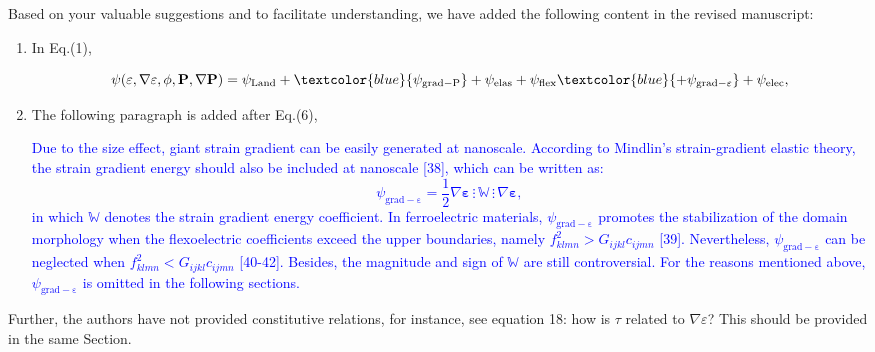 \documentclass[12pt,fleqn]{article}
\begin{document}
\begin{response}
    Based on your valuable suggestions and to facilitate understanding, we have added the following content in the revised manuscript:
    \begin{enumerate}
    \item In Eq.(1),
    \setcounter{equation}{0}
    \begin{revised}
        \begin{equation}
            \psi(\mathbf{\varepsilon},\nabla\mathbf{\varepsilon},\phi,\mathbf{P},\nabla\mathbf{P})
            =\psi_\mathrm{Land}+\textcolor{blue}{\psi_\mathrm{grad-P}}+\psi_\mathrm{elas}+\psi_\mathrm{flex}\textcolor{blue}{+\psi_\mathrm{grad-\varepsilon}}+\psi_\mathrm{elec},
        \end{equation}
    \end{revised}
        \item The following paragraph is added after Eq.(6),
        \setcounter{equation}{7}
        \begin{revised}
        \textcolor{blue}{
            Due to the size effect, giant strain gradient can be easily generated at nanoscale. According to Mindlin's strain-gradient elastic theory, the strain gradient energy should also be included at nanoscale  [38], which can be written as:
\begin{equation}
    \psi_\mathrm{grad-\varepsilon}=\frac{1}{2}\nabla\mathbf{\varepsilon}\,\vdots\,\mathbb{W}\,\vdots\,\nabla\mathbf{\varepsilon},
\end{equation}
in which $\mathbb{W}$ denotes the strain gradient energy coefficient. In ferroelectric materials, $\psi_\mathrm{grad-\varepsilon}$ promotes the stabilization of the domain morphology when the flexoelectric coefficients exceed the upper boundaries, namely $f_{klmn}^2>G_{ijkl}c_{ijmn}$ [39]. Nevertheless,  $\psi_\mathrm{grad-\varepsilon}$ can be neglected when $f_{klmn}^2<G_{ijkl}c_{ijmn}$ [40-42]. Besides, the magnitude and sign of $\mathbb{W}$ are still controversial. For the reasons mentioned above, $\psi_\mathrm{grad-\varepsilon}$ is omitted in the following sections.}
        \end{revised}
    \end{enumerate}
\end{response}
\begin{question}{}\label{R2:Q2}
 Further, the authors have not provided constitutive relations, for instance, see equation 18: how is $\tau$ related to $\nabla\varepsilon$? This should be provided in the same Section.
\end{question}
\end{document}
